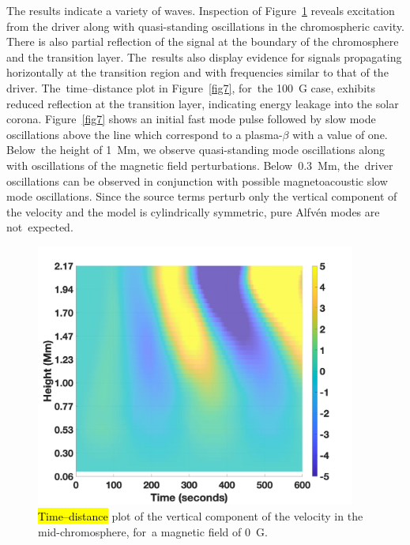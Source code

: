 \documentclass[physics,article,accept,pdftex,moreauthors]{Definitions/mdpi}
\begin{document}
The results indicate a variety of waves. Inspection of Figure~\ref{fig8} reveals excitation from the driver along with quasi-standing oscillations in the chromospheric cavity. There is also partial reflection of the signal at the boundary of the chromosphere and the transition layer. The~results also display evidence for signals propagating horizontally at the transition region and with frequencies similar to that of the driver. The~time--distance plot in Figure~\ref{fig7}, for~the 100~G case, exhibits reduced reflection at the transition layer, indicating energy leakage into the solar corona. Figure~\ref{fig7} shows an initial fast mode pulse followed by slow mode oscillations above the line which correspond to a plasma-$\beta$ with a value of one. Below~the height of 1~Mm, we observe quasi-standing mode oscillations along with oscillations of the magnetic field perturbations. Below~0.3~Mm, the~driver oscillations can be observed in conjunction with possible magnetoacoustic slow mode oscillations. Since the source terms perturb only the vertical component of the velocity and the model is cylindrically symmetric, pure Alfv\'en modes are not~expected.






\begin{figure}[H]
\includegraphics[width=10.5cm]{td_vert_bv0G_300.jpg}
\caption{\hl{Time--distance} %
 plot of the vertical component of the velocity in the mid-chromosphere, for~a magnetic field of 0~G.\label{fig8}}
\end{figure}
\unskip
\end{document}
